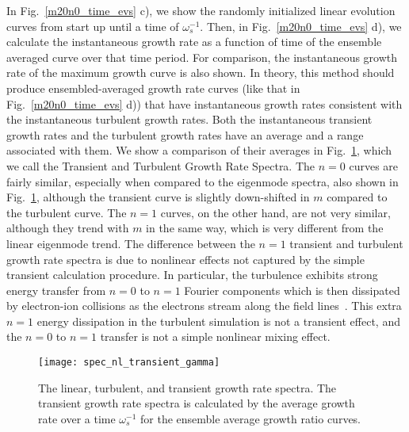 \documentclass[showpacs,preprintnumbers,amsmath,amssymb,superscriptaddress,aip]{revtex4-1}
\begin{document}
In Fig.~\ref{m20n0_time_evs} c), we show the randomly initialized linear evolution curves from start up until a time of $\omega_s^{-1}$. 
Then, in Fig.~\ref{m20n0_time_evs} d), we calculate the instantaneous growth rate as a function of time of the ensemble averaged curve over that time period. 
For comparison, the instantaneous growth rate of the maximum growth curve is also shown.
In theory, this method should produce ensembled-averaged growth rate curves (like that in Fig.~\ref{m20n0_time_evs} d)) that have instantaneous growth rates consistent with the instantaneous
turbulent growth rates. Both the instantaneous transient growth rates and the turbulent growth rates have an average and a range associated with them. We show a comparison of their averages
in Fig.~\ref{spec_nl_transient_gamma}, which we call the Transient and Turbulent Growth Rate Spectra. The $n=0$ curves are fairly similar, especially when compared to the eigenmode spectra, also
shown in Fig.~\ref{spec_nl_transient_gamma}, although the transient curve is slightly down-shifted in $m$ compared to the turbulent curve. 
The $n=1$ curves, on the other hand, are not very similar, although they trend with $m$ in the same way, which is very different from the linear eigenmode trend.
The difference between the $n=1$ transient and turbulent growth rate spectra is due to nonlinear effects not captured by the simple transient calculation procedure. In particular, the turbulence
exhibits strong energy transfer from $n=0$ to $n=1$ Fourier components which is then dissipated by electron-ion collisions as the electrons stream along the field lines~\cite{friedman2012b}. 
This extra $n=1$ energy dissipation in the turbulent simulation is not a transient effect, and the $n=0$ to $n=1$ transfer is not a simple nonlinear mixing effect.

\begin{figure}
\centerline{\texttt{[image: spec\_nl\_transient\_gamma]}}
\caption{The linear, turbulent, and transient growth rate spectra. The transient growth rate spectra is calculated by the average growth rate over a time $\omega_s^{-1}$ for the ensemble average
growth ratio curves.}
\label{spec_nl_transient_gamma}
\end{figure}
\end{document}

